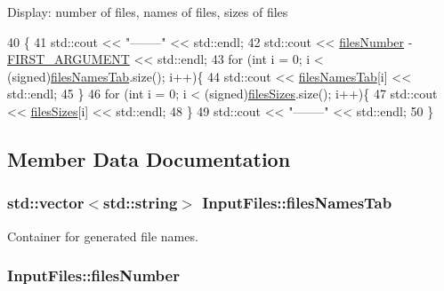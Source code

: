 Display\+: number of files, names of files, sizes of files 
\begin{DoxyCode}
40                           \{ 
41     std::cout << \textcolor{stringliteral}{"--------"} << std::endl;
42     std::cout << \hyperlink{class_input_files_a9614705947e6240bc2daa8cf3db42310}{filesNumber} - \hyperlink{inputfile__txt_8h_ac6795aca310766e1b10d90013aac6d47}{FIRST\_ARGUMENT} << std::endl;
43     \textcolor{keywordflow}{for} (\textcolor{keywordtype}{int} i = 0; i < (signed)\hyperlink{class_input_files_abbdfa73eda4af470d13c3d54a8665a0e}{filesNamesTab}.size(); i++)\{
44         std::cout << \hyperlink{class_input_files_abbdfa73eda4af470d13c3d54a8665a0e}{filesNamesTab}[i] << std::endl;
45     \}
46     \textcolor{keywordflow}{for} (\textcolor{keywordtype}{int} i = 0; i < (signed)\hyperlink{class_input_files_a2d6426414a58ca39751e3b26135341e0}{filesSizes}.size(); i++)\{
47         std::cout << \hyperlink{class_input_files_a2d6426414a58ca39751e3b26135341e0}{filesSizes}[i] << std::endl;
48     \}
49     std::cout << \textcolor{stringliteral}{"--------"} << std::endl;
50 \}
\end{DoxyCode}


\subsection{Member Data Documentation}
\hypertarget{class_input_files_abbdfa73eda4af470d13c3d54a8665a0e}{}
\subsubsection[{files\+Names\+Tab}]{\setlength{\rightskip}{0pt plus 5cm}std\+::vector$<$std\+::string$>$ Input\+Files\+::files\+Names\+Tab\hspace{0.3cm}{\ttfamily [private]}}\label{class_input_files_abbdfa73eda4af470d13c3d54a8665a0e}


Container for generated file names. 

\hypertarget{class_input_files_a9614705947e6240bc2daa8cf3db42310}{}
\subsubsection[{files\+Number}]{\setlength{\rightskip}{0pt plus 5cm}Input\+Files\+::files\+Number\hspace{0.3cm}{\ttfamily [private]}}\label{class_input_files_a9614705947e6240bc2daa8cf3db42310}


